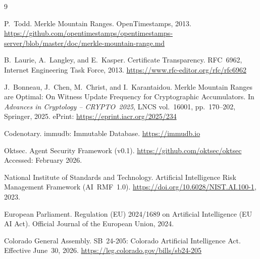 \documentclass[sigconf,natbib=false]{acmart}
\begin{document}

\begin{thebibliography}{9}

P.~Todd.
\newblock Merkle Mountain Ranges.
\newblock OpenTimestamps, 2013.
\newblock \url{https://github.com/opentimestamps/opentimestamps-server/blob/master/doc/merkle-mountain-range.md}

B.~Laurie, A.~Langley, and E.~Kasper.
\newblock Certificate Transparency.
\newblock RFC~6962, Internet Engineering Task Force, 2013.
\newblock \url{https://www.rfc-editor.org/rfc/rfc6962}

J.~Bonneau, J.~Chen, M.~Christ, and I.~Karantaidou.
\newblock Merkle Mountain Ranges are Optimal: On Witness Update Frequency for
  Cryptographic Accumulators.
\newblock In \textit{Advances in Cryptology -- CRYPTO~2025}, LNCS vol.~16001,
  pp.~170--202, Springer, 2025.
\newblock {}
\newblock ePrint: \url{https://eprint.iacr.org/2025/234}

Codenotary.
\newblock immudb: Immutable Database.
\newblock \url{https://immudb.io}

Oktsec.
\newblock Agent Security Framework (v0.1).
\newblock \url{https://github.com/oktsec/oktsec}
\newblock Accessed: February 2026.

National Institute of Standards and Technology.
\newblock Artificial Intelligence Risk Management Framework (AI~RMF~1.0).
\newblock \url{https://doi.org/10.6028/NIST.AI.100-1}, 2023.

European Parliament.
\newblock Regulation (EU) 2024/1689 on Artificial Intelligence (EU AI Act).
\newblock Official Journal of the European Union, 2024.

Colorado General Assembly.
\newblock SB~24-205: Colorado Artificial Intelligence Act.
\newblock Effective June~30, 2026.
\newblock \url{https://leg.colorado.gov/bills/sb24-205}

\end{thebibliography}
\end{document}
